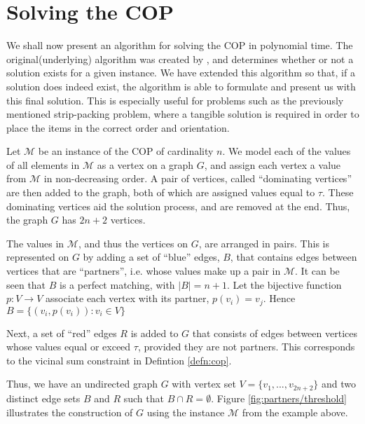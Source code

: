 \documentclass[oribibl]{llncs}
\begin{document}
\section{Solving the COP}
\label{sec:ahca}
We shall now present an algorithm for solving the COP in polynomial time. The original(underlying) algorithm was created by \cite{becker2010}, and determines whether or not a solution exists for a given instance. We have extended this algorithm so that, if a solution does indeed exist, the algorithm is able to formulate and present us with this final solution. This is especially useful for problems such as the previously mentioned strip-packing problem, where a tangible solution is required in order to place the items in the correct order and orientation.

Let $\mathcal{M}$ be an instance of the COP of cardinality $n$. We model each of the values of all elements in $\mathcal{M}$ as a vertex on a graph $G$, and assign each vertex a value from $\mathcal{M}$ in non-decreasing order. A pair of vertices, called ``dominating vertices'' are then added to the graph, both of which are assigned values equal to $\tau$. These dominating vertices aid the solution process, and are removed at the end. Thus, the graph $G$ has $2n+2$ vertices.

The values in $\mathcal{M}$, and thus the vertices on $G$, are arranged in pairs. This is represented on $G$ by adding a set of ``blue'' edges, $B$, that contains edges between vertices that are ``partners'', i.e. whose values make up a pair in $\mathcal{M}$. It can be seen that $B$ is a perfect matching, with $|B|= n+1$. Let the bijective function $p: V \to V$ associate each vertex with its partner, $p(v_i) = v_j$. Hence $B = \{(v_i, p(v_i)) : v_i \in V\}$

Next, a set of ``red'' edges $R$ is added to $G$ that consists of edges between vertices whose values equal or exceed $\tau$, provided they are not partners. This corresponds to the vicinal sum constraint in Defintion \ref{defn:cop}. 

Thus, we have an undirected graph $G$ with vertex set $V = \{v_1, ..., v_{2n+2}\}$ and two distinct edge sets $B$ and $R$ such that $B \cap R = \emptyset$. Figure \ref{fig:partners/threshold} illustrates the construction of $G$ using the instance $\mathcal{M}$ from the example above.
\end{document}
